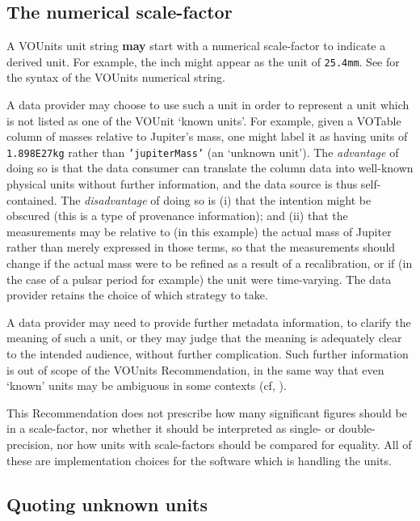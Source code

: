 \documentclass[11pt,a4paper]{ivoa}
\newcommand{\unit}[1]{\texttt{\small\color{orange}#1}}
\newcommand*\norm[1]{\textbf{\color{ivoacolor}#1}}
\begin{document}
\subsection{The numerical scale-factor}
\label{sec:scalefactor}

A VOUnits unit string \norm{may} start with a numerical scale-factor
to indicate a derived unit.  For example, the inch might appear as the
unit of \unit{25.4mm}.  See  for the syntax
of the VOUnits numerical string.

A data provider may choose to use such a unit in order to represent a
unit which is not listed as one of the VOUnit `known units'.  For
example, given a VOTable column of masses relative to Jupiter's mass,
one might label it as having units of \unit{1.898E27kg} rather than
\unit{'jupiterMass'} (an `unknown unit').
The \emph{advantage} of doing so is that the data consumer can
translate the column data into well-known physical units without further
information, and the data source is thus self-contained.
The \emph{disadvantage} of doing so is (i) that the intention might be
obscured (this is a type of provenance information);
and (ii) that the measurements may be relative to (in this example)
the actual mass of Jupiter rather than merely expressed in those terms,
so that the measurements should change if the actual mass were to be
refined as a result of a recalibration, or if (in the case of a pulsar
period for example) the unit were time-varying.  The data provider retains the
choice of which strategy to take.

A data provider may need to provide further metadata information, to
clarify the meaning of such a unit, or they may judge that the meaning
is adequately clear to the intended audience, without further
complication.  Such further information is out of scope of the VOUnits
Recommendation, in the same way that even `known' units may be
ambiguous in some contexts (cf, ).

This Recommendation does not prescribe how many significant figures
should be in a scale-factor, nor whether it should be interpreted as
single- or double-precision, nor how units with scale-factors should
be compared for equality.  All of these are implementation choices for
the software which is handling the units.

\subsection{Quoting unknown units\label{sec:quoting}}
\end{document}
